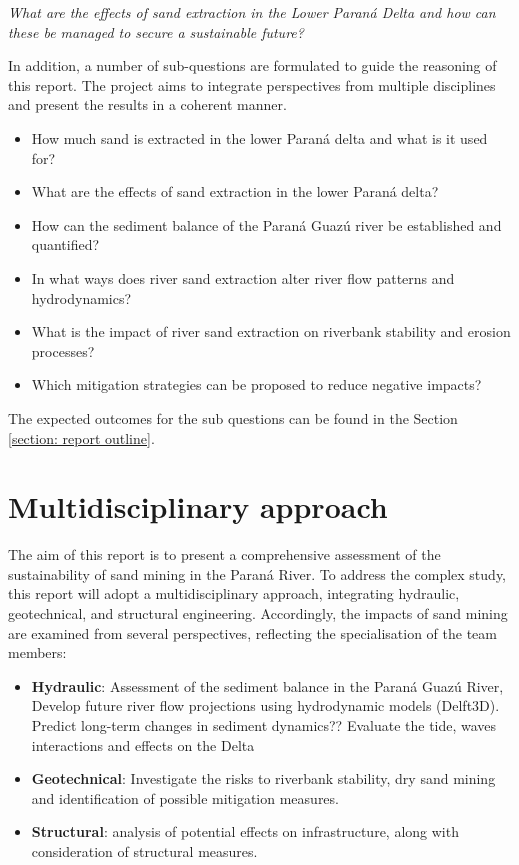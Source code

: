 \textit{What are the effects of sand extraction in the Lower Paraná Delta and how can these be managed to secure a sustainable future?}

In addition, a number of sub-questions are formulated to guide the reasoning of this report. The project aims to integrate perspectives from multiple disciplines and present the results in a coherent manner.

\begin{itemize} 
    \item How much sand is extracted in the lower Paraná delta and what is it used for?
    \item What are the effects of sand extraction in the lower Paraná delta?
    \item How can the sediment balance of the Paraná Guazú river be established and quantified?
    \item In what ways does river sand extraction alter river flow patterns and hydrodynamics?
    \item What is the impact of river sand extraction on riverbank stability and erosion processes?
    \item Which mitigation strategies can be proposed to reduce negative impacts?

\end{itemize}

The expected outcomes for the sub questions can be found in the Section \ref{section: report outline}.

\section{Multidisciplinary approach}
The aim of this report is to present a comprehensive assessment of the sustainability of sand mining in the Paraná River.
To address the complex study, this report will adopt a multidisciplinary approach, integrating hydraulic, geotechnical, and structural engineering.
Accordingly, the impacts of sand mining are examined from several perspectives, reflecting the specialisation of the team members:

\begin{itemize}
    \item \textbf{Hydraulic}: 
    Assessment of the sediment balance in the Paraná Guazú River,
    Develop future river flow projections using hydrodynamic models (Delft3D). Predict long-term changes in sediment dynamics??
    Evaluate the tide, waves interactions and effects on the Delta
    \item \textbf{Geotechnical}: 
    Investigate the risks to riverbank stability, dry sand mining and identification of possible mitigation measures.
    \item \textbf{Structural}: analysis of potential effects on infrastructure, along with consideration of structural measures.
\end{itemize}

